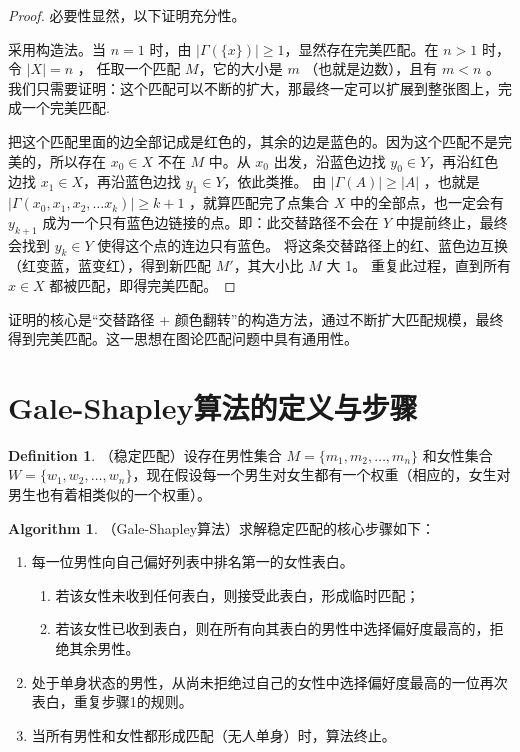 \documentclass[oneside]{book}
\theoremstyle{definition}
\newtheorem{definition}{Definition}[section]
\newtheorem*{algorithm}{Algorithm}
\begin{document}
\begin{proof}
	必要性显然，以下证明充分性。
	
	采用构造法。当 \( n = 1 \) 时，由 \( |\Gamma(\{x\})| \geq 1 \)，显然存在完美匹配。在 \( n > 1 \) 时，令 \( |X| = n \) ，
	任取一个匹配 \( M \)，它的大小是 \(m\) （也就是边数），且有 \(m<n\) 。我们只需要证明：这个匹配可以不断的扩大，那最终一定可以扩展到整张图上，完成一个完美匹配.
	
	把这个匹配里面的边全部记成是红色的，其余的边是蓝色的。因为这个匹配不是完美的，所以存在 \( x_0 \in X \) 不在 \( M \) 中。从 \( x_0 \) 出发，沿蓝色边找 \( y_0 \in Y \)，再沿红色边找 \( x_1 \in X \)，再沿蓝色边找 \( y_1 \in Y \)，依此类推。
	由 \( |\Gamma(A)| \geq |A| \) ，也就是 \( |\Gamma({x_0,x_1,x_2,\dots x_k})| \geq k+1 \) ，就算匹配完了点集合 \( X\) 中的全部点，也一定会有 \( y_{k+1}\) 成为一个只有蓝色边链接的点。即：此交替路径不会在 \( Y \) 中提前终止，最终会找到 \( y_k \in Y \) 使得这个点的连边只有蓝色。
	将这条交替路径上的红、蓝色边互换（红变蓝，蓝变红），得到新匹配 \( M' \)，其大小比 \( M \) 大 1。
	重复此过程，直到所有 \( x \in X \) 都被匹配，即得完美匹配。
\end{proof}
证明的核心是“交替路径 + 颜色翻转”的构造方法，通过不断扩大匹配规模，最终得到完美匹配。这一思想在图论匹配问题中具有通用性。


	\section{Gale-Shapley算法的定义与步骤}

\begin{definition}
	（稳定匹配）设存在男性集合 \( M = \{m_1, m_2, \dots, m_n\} \) 和女性集合 \( W = \{w_1, w_2, \dots, w_n\} \)，现在假设每一个男生对女生都有一个权重（相应的，女生对男生也有着相类似的一个权重）。
\end{definition}

\begin{algorithm}
	（Gale-Shapley算法）求解稳定匹配的核心步骤如下：
	\begin{enumerate}[label=step \arabic*]
	\item 每一位男性向自己偏好列表中排名第一的女性表白。
		\begin{enumerate}
			\item 若该女性未收到任何表白，则接受此表白，形成临时匹配；
			\item 若该女性已收到表白，则在所有向其表白的男性中选择偏好度最高的，拒绝其余男性。
		\end{enumerate}
		\item 处于单身状态的男性，从尚未拒绝过自己的女性中选择偏好度最高的一位再次表白，重复步骤1的规则。
		\item 当所有男性和女性都形成匹配（无人单身）时，算法终止。
	\end{enumerate}
\end{algorithm}
\end{document}
